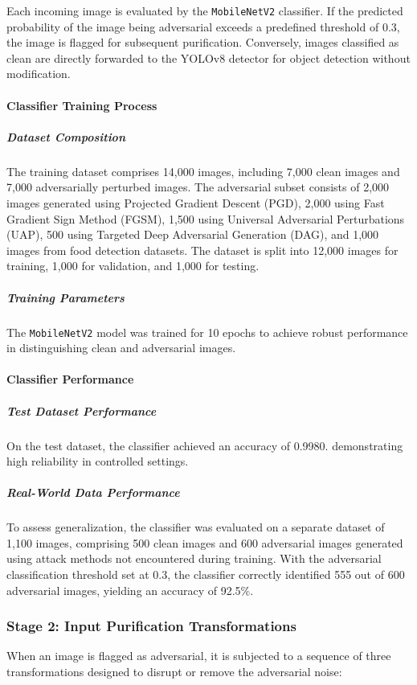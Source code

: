 \documentclass[../main.tex]{subfiles}
\begin{document}
Each incoming image is evaluated by the \texttt{MobileNetV2} classifier. If the predicted probability of the image being adversarial exceeds a predefined threshold of 0.3, the image is flagged for subsequent purification. Conversely, images classified as clean are directly forwarded to the YOLOv8 detector for object detection without modification.

\paragraph{Classifier Training Process}

\subparagraph{Dataset Composition}
The training dataset comprises 14,000 images, including 7,000 clean images and 7,000 adversarially perturbed images. The adversarial subset consists of 2,000 images generated using Projected Gradient Descent (PGD), 2,000 using Fast Gradient Sign Method (FGSM), 1,500 using Universal Adversarial Perturbations (UAP), 500 using Targeted Deep Adversarial Generation (DAG), and 1,000 images from food detection datasets. The dataset is split into 12,000 images for training, 1,000 for validation, and 1,000 for testing.

\subparagraph{Training Parameters}
The \texttt{MobileNetV2} model was trained for 10 epochs to achieve robust performance in distinguishing clean and adversarial images.

\paragraph{Classifier Performance}

\subparagraph{Test Dataset Performance}
On the test dataset, the classifier achieved an accuracy of 0.9980. demonstrating high reliability in controlled settings.

\subparagraph{Real-World Data Performance}
To assess generalization, the classifier was evaluated on a separate dataset of 1,100 images, comprising 500 clean images and 600 adversarial images generated using attack methods not encountered during training. With the adversarial classification threshold set at 0.3, the classifier correctly identified 555 out of 600 adversarial images, yielding an accuracy of 92.5\%.


\subsubsection{Stage 2: Input Purification Transformations}
When an image is flagged as adversarial, it is subjected to a sequence of three transformations designed to disrupt or remove the adversarial noise:
\end{document}
